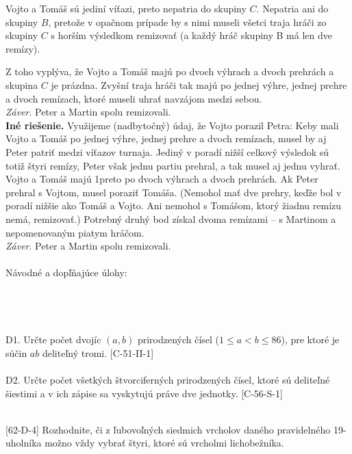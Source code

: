 Vojto a Tomáš sú jediní víťazi, preto nepatria do skupiny $C$. Nepatria ani do skupiny $B$, pretože v opačnom prípade by s nimi museli všetci traja hráči zo skupiny $C$ s horším výsledkom remizovať (a každý hráč skupiny B má len dve remízy).

Z toho vyplýva, že Vojto a Tomáš majú po dvoch výhrach a dvoch prehrách a skupina $C$ je prázdna. Zvyšní traja hráči tak majú po jednej výhre, jednej prehre a dvoch remízach, ktoré museli uhrať navzájom medzi sebou.\\
\textit{Záver}. Peter a Martin spolu remizovali.\\

\textbf{Iné riešenie.} Využijeme (nadbytočný) údaj, že Vojto porazil Petra: Keby mali Vojto a Tomáš po jednej výhre, jednej prehre a dvoch remízach, musel by aj Peter patriť medzi víťazov turnaja. Jediný v poradí nižší celkový výsledok sú totiž štyri remízy, Peter však jednu partiu prehral, a tak musel aj jednu vyhrať. Vojto a Tomáš majú 1preto po dvoch výhrach a dvoch prehrách. Ak Peter prehral s Vojtom, musel poraziť Tomáša. (Nemohol mať dve prehry, keďže bol v poradí nižšie ako Tomáš a Vojto. Ani nemohol s Tomášom, ktorý žiadnu remízu nemá, remizovať.) Potrebný druhý bod získal dvoma remízami -- s Martinom a nepomenovaným piatym hráčom.\\
\textit{Záver}. Peter a Martin spolu remizovali.\\
\\

Návodné a dopľňajúce úlohy: \\
\\
\
\\
\\
\\
D1. Určte počet dvojíc $(a, b)$ prirodzených čísel ($1 \leq a < b  \leq 86$), pre ktoré je súčin $ab$ deliteľný tromi. [C-51-II-1]\\
\\
D2. Určte počet všetkých štvorciferných prirodzených čísel, ktoré sú deliteľné šiestimi a v ich zápise sa vyskytujú práve dve jednotky. [C-56-S-1]\\
\\
\begin{tcolorbox}[breakable,notitle,boxrule=0pt,colback=light-gray,colframe=light-gray]\ul [62-D-4]
Rozhodnite, či z ľubovoľných siedmich vrcholov daného pravidelného 19-uholníka možno vždy vybrať štyri, ktoré sú vrcholmi lichobežníka.

\end{tcolorbox}

